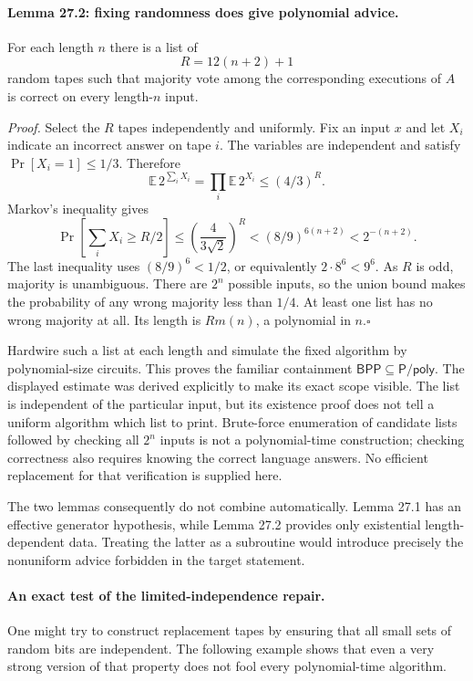 \documentclass[11pt]{article}
\begin{document}
\paragraph{Lemma 27.2: fixing randomness does give polynomial advice.}
For each length $n$ there is a list of
\[
                       R=12(n+2)+1
\]
random tapes such that majority vote among the corresponding executions of
$A$ is correct on every length-$n$ input.

\emph{Proof.} Select the $R$ tapes independently and uniformly. Fix an input
$x$ and let $X_i$ indicate an incorrect answer on tape $i$. The variables
are independent and satisfy $\Pr[X_i=1]\le1/3$. Therefore
\[
 \mathbb E\,2^{\sum_i X_i}
       =\prod_i\mathbb E\,2^{X_i}\le(4/3)^R.
\]
Markov's inequality gives
\[
 \Pr\left[\sum_iX_i\ge R/2\right]
       \le\left(\frac4{3\sqrt2}\right)^R
       <(8/9)^{6(n+2)}<2^{-(n+2)}.
\]
The last inequality uses $(8/9)^6<1/2$, or equivalently
$2\cdot8^6<9^6$. As $R$ is odd, majority is unambiguous. There are $2^n$
possible inputs, so the union bound makes the probability of any wrong
majority less than $1/4$. At least one list has no wrong majority at all.
Its length is $Rm(n)$, a polynomial in $n$.\hfill$\square$

Hardwire such a list at each length and simulate the fixed algorithm by
polynomial-size circuits. This proves the familiar containment
$\mathsf{BPP}\subseteq\mathsf{P/poly}$. The displayed estimate was derived
explicitly to make its exact scope visible. The list is independent of the
particular input, but its existence proof does not tell a uniform algorithm
which list to print. Brute-force enumeration of candidate lists followed by
checking all $2^n$ inputs is not a polynomial-time construction; checking
correctness also requires knowing the correct language answers. No efficient
replacement for that verification is supplied here.

The two lemmas consequently do not combine automatically. Lemma 27.1 has
an effective generator hypothesis, while Lemma 27.2 provides only existential
length-dependent data. Treating the latter as a subroutine would introduce
precisely the nonuniform advice forbidden in the target statement.

\paragraph{An exact test of the limited-independence repair.}
One might try to construct replacement tapes by ensuring that all small sets
of random bits are independent. The following example shows that even a
very strong version of that property does not fool every polynomial-time
algorithm.
\end{document}
